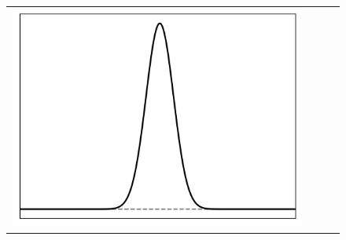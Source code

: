 \documentclass[10pt,final,xcolor=dvipsnames]{beamer}
\begin{document}
\begin{frame}
\begin{figure}
{\begin{tabular}{cccc}
	    \includegraphics[scale=0.2]{localpsf_revised_figures/ricker_1d_a=0.0.png} \\

\end{tabular}}
\end{figure}
\end{frame}
\end{document}
